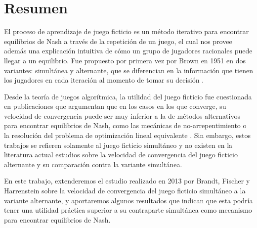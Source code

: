 \chapter*{Resumen}


El proceso de aprendizaje de juego ficticio es un método iterativo para encontrar equilibrios de Nash a través de la repetición de un juego, el cual nos provee además una explicación intuitiva de cómo un grupo de jugadores racionales puede llegar a un equilibrio. Fue propuesto por primera vez por Brown en 1951 en dos variantes: simultánea y alternante, que se diferencian en la información que tienen los jugadores en cada iteración al momento de tomar su decisión \cite{brown:1951}.

Desde la teoría de juegos algorítmica, la utilidad del juego ficticio fue cuestionada en publicaciones que argumentan que en los casos en los que converge, su velocidad de convergencia puede ser muy inferior a la de métodos alternativos para encontrar equilibrios de Nash, como las mecánicas de no-arrepentimiento o la resolución del problema de optimización lineal equivalente \cite{modified:fp:linear}. Sin embargo, estos trabajos se refieren solamente al juego ficticio simultáneo y no existen en la literatura actual estudios sobre la velocidad de convergencia del juego ficticio alternante y su comparación contra la variante simultánea.

En este trabajo, extenderemos el estudio realizado en 2013 por Brandt, Fischer y Harrenstein \cite{brandt:rate:convergence} sobre la velocidad de convergencia del juego ficticio simultáneo a la variante alternante, y aportaremos algunos resultados que indican que esta podría tener una utilidad práctica superior a su contraparte simultánea como mecanismo para encontrar equilibrios de Nash.